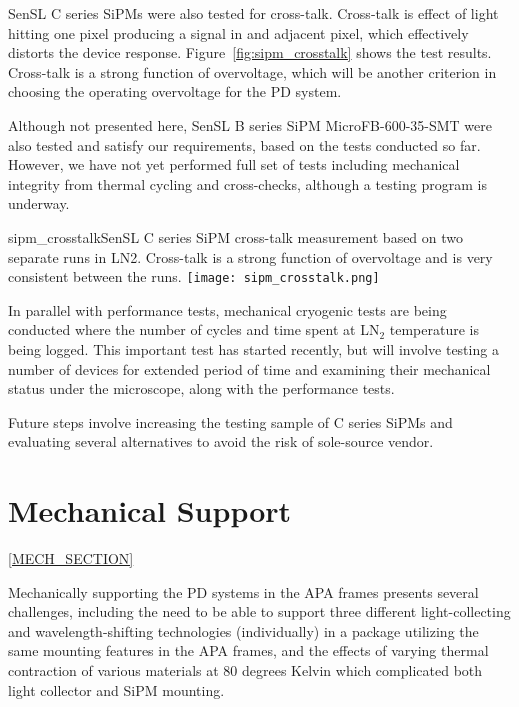 SenSL C series SiPMs were also tested for cross-talk. Cross-talk is
effect of light hitting one pixel producing a signal in and adjacent
pixel, which effectively distorts the device
response. Figure~\ref{fig:sipm_crosstalk} shows the test
results. Cross-talk is a strong function of overvoltage, which will be
another criterion in choosing the operating overvoltage for the PD
system.

Although not presented here, SenSL B series SiPM MicroFB-600-35-SMT
were also tested and satisfy our requirements, based on the tests
conducted so far. However, we have not yet performed full set of
tests including mechanical integrity from thermal cycling and
cross-checks, although a testing program is underway. 

\begin{cdrfigure}{sipm_crosstalk}{SenSL C series SiPM cross-talk measurement
    based on two separate runs in LN2. Cross-talk is a strong function
    of overvoltage and is very consistent between the runs.}       
  \texttt{[image: sipm\_crosstalk.png]}
\end{cdrfigure}

In parallel with performance tests, mechanical cryogenic tests are
being conducted where the number of cycles and time spent at LN$_2$
temperature is being logged. This important test has started recently,
but will involve testing a number of devices for extended period of
time and examining their mechanical status under the microscope, along
with the performance tests.

Future steps involve increasing the testing sample of C series SiPMs
and evaluating several alternatives to avoid the risk of sole-source
vendor.

\section{Mechanical Support}
\ref{MECH_SECTION}

Mechanically supporting the PD systems in the APA frames presents
several challenges, including the need to be able to support three
different light-collecting and wavelength-shifting technologies
(individually) in a package utilizing the same mounting features in
the APA frames, and the effects of varying thermal contraction of
various materials at 80 degrees Kelvin which complicated both light
collector and SiPM mounting.

